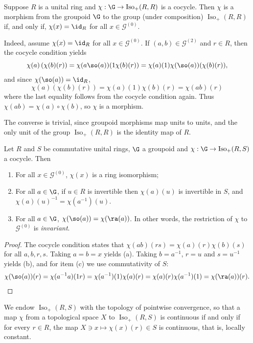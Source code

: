 \begin{example}
Suppose $R$ is a unital ring and $\chi:\G\to\operatorname{Iso}_+(R,R)$ is a cocycle. Then $\chi$ is a morphism from the groupoid $\G$ to the group (under composition) $\operatorname{Iso}_+(R,R)$ if, and only if, $\chi(x)=\id_R$ for all $x\in \mathcal{G}^{(0)}$.

Indeed, assume $\chi(x)=\id_R$ for all $x\in\mathcal{G}^{(0)}$. If $(a,b)\in\mathcal{G}^{(2)}$ and $r\in R$, then the cocycle condition yields
\[\chi(a)\left(\chi(b)(r)\right)=\chi(a\so(a))(1\chi(b)(r))=\chi(a)(1)\chi(\so(a))(\chi(b)(r)),\]
and since $\chi(\so(a))=\id_R$,
\[\chi(a)\left(\chi(b)(r)\right)=\chi(a)(1)\chi(b)(r)=\chi(ab)(r)\]
where the last equality follows from the cocycle condition again. Thus $\chi(ab)=\chi(a)\circ\chi(b)$, so $\chi$ is a morphism.

The converse is trivial, since groupoid morphisms map units to units, and the only unit of the group $\operatorname{Iso}_+(R,R)$ is the identity map of $R$.
\end{example}

\begin{proposition}
Let $R$ and $S$ be commutative unital rings, $\G$ a groupoid and $\chi:\G\to\operatorname{Iso}_+(R,S)$ a cocycle. Then
\begin{enumerate}
\item[(a)] For all $x\in\mathcal{G}^{(0)}$, $\chi(x)$ is a ring isomorphism;
\item[(b)] For all $a\in\G$, if $u\in R$ is invertible then $\chi(a)(u)$ is invertible in $S$, and $\chi(a)(u)^{-1}=\chi(a^{-1})(u)$.
\item[(c)] For all $a\in\G$, $\chi(\so(a))=\chi(\ra(a))$. In other words, the restriction of $\chi$ to $\mathcal{G}^{(0)}$ is \emph{invariant}.
\end{enumerate}
\end{proposition}
\begin{proof}
The cocycle condition states that $\chi(ab)(rs)=\chi(a)(r)\chi(b)(s)$ for all $a,b,r,s$. Taking $a=b=x$ yields (a). Taking $b=a^{-1}$, $r=u$ and $s=u^{-1}$ yields (b), and for item (c) we use commutativity of $S$:
\[\chi(\so(a))(r)=\chi(a^{-1}a)(1r)=\chi(a^{-1})(1)\chi(a)(r)=\chi(a)(r)\chi(a^{-1})(1)=\chi(\ra(a))(r).\qedhere\]
\end{proof}

We endow $\operatorname{Iso}_+(R,S)$ with the topology of pointwise convergence, so that a map $\chi$ from a topological space $X$ to $\operatorname{Iso}_+(R,S)$ is continuous if and only if for every $r\in R$, the map $X\ni x\mapsto\chi(x)(r)\in S$ is continuous, that is, locally constant.


